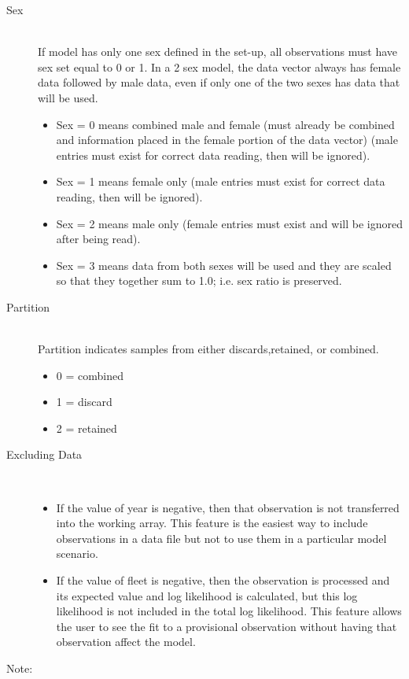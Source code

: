 \begin{description}
	\item[Sex]\hfill\\
	If model has only one sex defined in the set-up, all observations must have sex set equal to 0 or 1.  In a 2 sex model, the data vector always has female data followed by male data, even if only one of the two sexes has data that will be used.
	\begin{itemize}
		\item Sex = 0 means combined male and female (must already be combined and information placed in the female portion of the data vector) (male entries must exist for correct data reading, then will be ignored).
		\item Sex = 1 means female only (male entries must exist for correct data reading, then will be ignored).
		\item Sex = 2 means male only (female entries must exist and will be ignored after being read).
		\item Sex = 3 means data from both sexes will be used and they are scaled so that they together sum to 1.0; i.e. sex ratio is preserved.
	\end{itemize}
	\item[Partition]\hfill\\
	Partition indicates samples from either discards,retained, or combined.
	\begin{itemize}
		\item 0 = combined
		\item 1 = discard
		\item 2 = retained
	\end{itemize}
	\item[Excluding Data]\
	\begin{itemize}
		\item If the value of year is negative, then that observation is not transferred into the working array.  This feature is the easiest way to include observations in a data file but not to use them in a particular model scenario.
		\item If the value of fleet is negative, then the observation is processed and its expected value and log likelihood is calculated, but this log likelihood is not included in the total log likelihood.  This feature allows the user to see the fit to a provisional observation without having that observation affect the model.
	\end{itemize}
	\item[Note:]\
	\begin{itemize}

\end{itemize}
\end{description}
